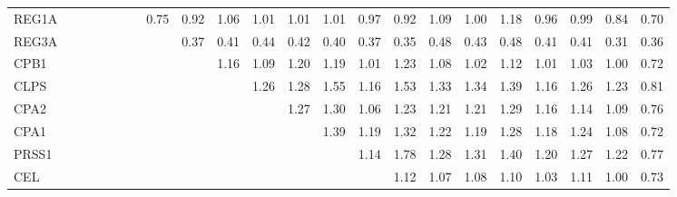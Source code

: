 \begin{longtable}{lrrrrrrrrrrrrrrrrrrrrr}
REG1A    &              &              &              &             &             &             &        0.75 &       0.92 &       1.06 &       1.01 &       1.01 &        1.01 &      0.97 &        0.92 &           1.09 &          1.00 &      1.18 &        0.96 &        0.99 &       0.84 &        0.70 \\
REG3A    &              &              &              &             &             &             &             &       0.37 &       0.41 &       0.44 &       0.42 &        0.40 &      0.37 &        0.35 &           0.48 &          0.43 &      0.48 &        0.41 &        0.41 &       0.31 &        0.36 \\
CPB1     &              &              &              &             &             &             &             &            &       1.16 &       1.09 &       1.20 &        1.19 &      1.01 &        1.23 &           1.08 &          1.02 &      1.12 &        1.01 &        1.03 &       1.00 &        0.72 \\
CLPS     &              &              &              &             &             &             &             &            &            &       1.26 &       1.28 &        1.55 &      1.16 &        1.53 &           1.33 &          1.34 &      1.39 &        1.16 &        1.26 &       1.23 &        0.81 \\
CPA2     &              &              &              &             &             &             &             &            &            &            &       1.27 &        1.30 &      1.06 &        1.23 &           1.21 &          1.21 &      1.29 &        1.16 &        1.14 &       1.09 &        0.76 \\
CPA1     &              &              &              &             &             &             &             &            &            &            &            &        1.39 &      1.19 &        1.32 &           1.22 &          1.19 &      1.28 &        1.18 &        1.24 &       1.08 &        0.72 \\
PRSS1    &              &              &              &             &             &             &             &            &            &            &            &             &      1.14 &        1.78 &           1.28 &          1.31 &      1.40 &        1.20 &        1.27 &       1.22 &        0.77 \\
CEL      &              &              &              &             &             &             &             &            &            &            &            &             &           &        1.12 &           1.07 &          1.08 &      1.10 &        1.03 &        1.11 &       1.00 &        0.73 \\

\end{longtable}
